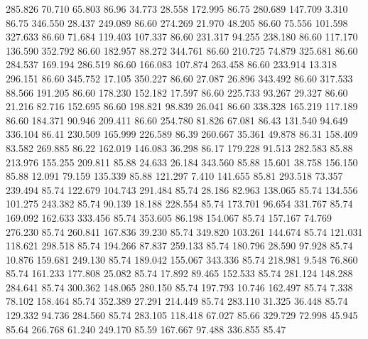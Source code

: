  285.826   70.710   65.803        86.96
  34.773   28.558  172.995        86.75
 280.689  147.709    3.310        86.75
 346.550   28.437  249.089        86.60
 274.269   21.970   48.205        86.60
  75.556  101.598  327.633        86.60
  71.684  119.403  107.337        86.60
 231.317   94.255  238.180        86.60
 117.170  136.590  352.792        86.60
 182.957   88.272  344.761        86.60
 210.725   74.879  325.681        86.60
 284.537  169.194  286.519        86.60
 166.083  107.874  263.458        86.60
 233.914   13.318  296.151        86.60
 345.752   17.105  350.227        86.60
  27.087   26.896  343.492        86.60
 317.533   88.566  191.205        86.60
 178.230  152.182   17.597        86.60
 225.733   93.267   29.327        86.60
  21.216   82.716  152.695        86.60
 198.821   98.839   26.041        86.60
 338.328  165.219  117.189        86.60
 184.371   90.946  209.411        86.60
 254.780   81.826   67.081        86.43
 131.540   94.649  336.104        86.41
 230.509  165.999  226.589        86.39
 260.667   35.361   49.878        86.31
 158.409   83.582  269.885        86.22
 162.019  146.083   36.298        86.17
 179.228   91.513  282.583        85.88
 213.976  155.255  209.811        85.88
  24.633   26.184  343.560        85.88
  15.601   38.758  156.150        85.88
  12.091   79.159  135.339        85.88
 121.297    7.410  141.655        85.81
 293.518   73.357  239.494        85.74
 122.679  104.743  291.484        85.74
  28.186   82.963  138.065        85.74
 134.556  101.275  243.382        85.74
  90.139   18.188  228.554        85.74
 173.701   96.654  331.767        85.74
 169.092  162.633  333.456        85.74
 353.605   86.198  154.067        85.74
 157.167   74.769  276.230        85.74
 260.841  167.836   39.230        85.74
 349.820  103.261  144.674        85.74
 121.031  118.621  298.518        85.74
 194.266   87.837  259.133        85.74
 180.796   28.590   97.928        85.74
  10.876  159.681  249.130        85.74
 189.042  155.067  343.336        85.74
 218.981    9.548   76.860        85.74
 161.233  177.808   25.082        85.74
  17.892   89.465  152.533        85.74
 281.124  148.288  284.641        85.74
 300.362  148.065  280.150        85.74
 197.793   10.746  162.497        85.74
   7.338   78.102  158.464        85.74
 352.389   27.291  214.449        85.74
 283.110   31.325   36.448        85.74
 129.332   94.736  284.560        85.74
 283.105  118.418   67.027        85.66
 329.729   72.998   45.945        85.64
 266.768   61.240  249.170        85.59
 167.667   97.488  336.855        85.47

